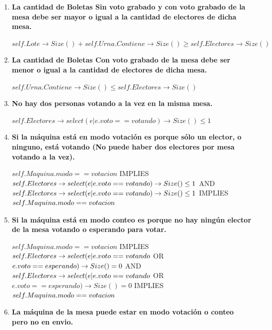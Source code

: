 \begin{enumerate}
\item \textbf{La cantidad de Boletas Sin voto grabado y con voto grabado de la mesa debe ser mayor o igual a la cantidad de electores de dicha mesa.}

$self.Lote \rightarrow Size() + self.Urna.Contiene \rightarrow Size () \geq self.Electores \rightarrow Size()$

\item \textbf{La cantidad de Boletas Con voto grabado de la mesa debe ser menor o igual a la cantidad de electores de dicha mesa.}

$self.Urna.Contiene  \rightarrow  Size() \leq self.Electores \rightarrow Size()$

\item \textbf{No hay dos personas votando a la vez en la misma mesa.}

$self.Electores \rightarrow select( e | e.voto == votando) \rightarrow Size() \leq 1 $

\item \textbf{Si la máquina está en modo votación es porque s\'olo un elector, o ninguno, está votando (No puede haber dos electores por mesa votando a la vez).}

$self.Maquina.modo == votacion$  IMPLIES  $ \\
self.Electores \rightarrow select(e | e.voto == votando) \rightarrow Size() \leq 1 \\ $
 AND $ \\
 self.Electores \rightarrow select(e | e.voto == votando) \rightarrow Size() \leq 1 $  IMPLIES  $ \\
 self.Maquina.modo == votacion $

\item \textbf{Si la máquina está en modo conteo es porque no hay ningún elector de la mesa votando o esperando para votar.}

$self.Maquina.modo == votacion$  IMPLIES  $ \\
self.Electores \rightarrow select(e | e.voto == votando$ OR $e.voto == esperando) \rightarrow Size() = 0 \\ $
 AND $ \\
 self.Electores \rightarrow select(e | e.voto == votando$ OR $e.voto == esperando) \rightarrow Size() = 0 $  IMPLIES  $ \\
self.Maquina.modo == votacion $

\item \textbf{La máquina de la mesa puede estar en modo votación o conteo pero no en envio.}


\end{enumerate}
